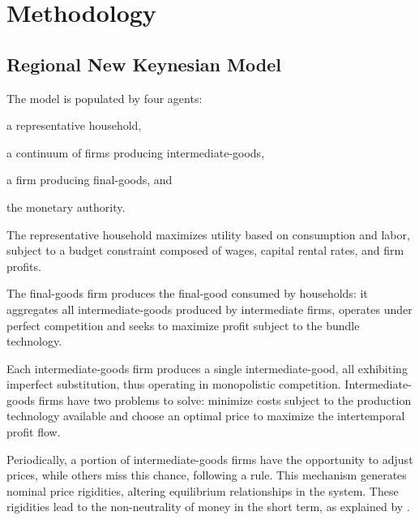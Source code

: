 \documentclass[../thesis.tex]{subfiles}
\begin{document}
	\newpage

\section{Methodology}\label{sec:methodology}


{
	\setlength{\parskip}{1pt}
	\singlespacing
	
	\localtableofcontents
}

\subsection{Regional New Keynesian Model}\label{sec_v6:nk-model}

	The model is populated by four agents: 
	\begin{enumerate*}[label=(\arabic*)]
	\item a representative household,
	\item a continuum of firms producing intermediate-goods,
	\item a firm producing final-goods, and
	\item the monetary authority.
	\end{enumerate*}

	The representative household maximizes utility based on consumption and labor, subject to a budget constraint composed of wages, capital rental rates, and firm profits.
	
	The final-goods firm produces the final-good consumed by households: it aggregates all intermediate-goods produced by intermediate firms, operates under perfect competition and seeks to maximize profit subject to the bundle technology.
	
	Each intermediate-goods firm produces a single intermediate-good, all exhibiting imperfect substitution, thus operating in monopolistic competition. Intermediate-goods firms have two problems to solve: minimize costs subject to the production technology available and choose an optimal price to maximize the intertemporal profit flow.
	
	Periodically, a portion of intermediate-goods firms have the opportunity to adjust prices, while others miss this chance, following a \textcite{calvo_staggered_1983} rule. This mechanism generates nominal price rigidities, altering equilibrium relationships in the system. These rigidities lead to the non-neutrality of money in the short term, as explained by \textcite[p.191]{costa_junior_understanding_2016}.
	
\end{document}
